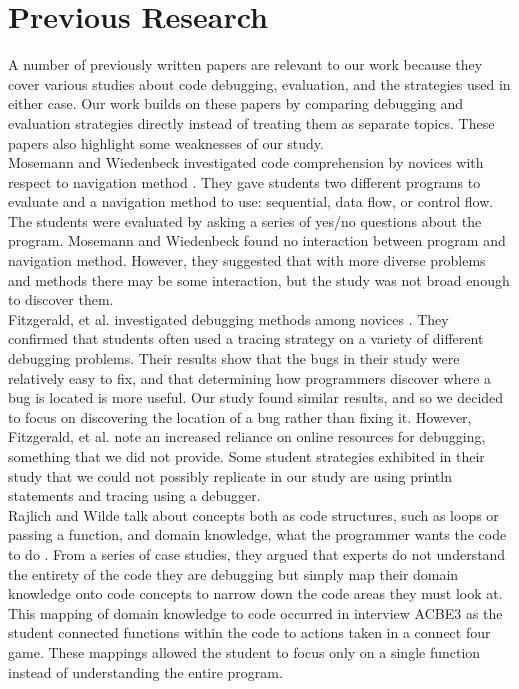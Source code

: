 \section{Previous Research}

A number of previously written papers are relevant to our work because they cover various studies about code debugging, evaluation, and the strategies used in either case. Our work builds on these papers by comparing debugging and evaluation strategies directly instead of treating them as separate topics. These papers also highlight some weaknesses of our study. \\

Mosemann and Wiedenbeck investigated code comprehension by novices with respect to navigation method \cite{mosemann2001}.
They gave students two different programs to evaluate and a navigation method to use: sequential, data flow, or control flow.
The students were evaluated by asking a series of yes/no questions about the program.
Mosemann and Wiedenbeck found no interaction between program and navigation method.
However, they suggested that with more diverse problems and methods there may be some interaction, but the study was not broad enough to discover them.\\

Fitzgerald, et al. investigated debugging methods among novices \cite{fitzgerald2008}.
They confirmed that students often used a tracing strategy on a variety of different debugging problems.
Their results show that the bugs in their study were relatively easy to fix, and that determining how programmers discover where a bug is located is more useful.
Our study found similar results, and so we decided to focus on discovering the location of a bug rather than fixing it.
However, Fitzgerald, et al. note an increased reliance on online resources for debugging, something that we did not provide.
Some student strategies exhibited in their study that we could not possibly replicate in our study are using println statements and tracing using a debugger.\\

Rajlich and Wilde talk about concepts both as code structures, such as loops or passing a function, and domain knowledge, what the programmer wants the code to do \cite{1021348}.
From a series of case studies, they argued that experts do not understand the entirety of the code they are debugging but simply map their domain knowledge onto code concepts to narrow down the code areas they must look at.
This mapping of domain knowledge to code occurred in interview ACBE3 as the student connected functions within the code to actions taken in a connect four game.
These mappings allowed the student to focus only on a single function instead of understanding the entire program.\\

